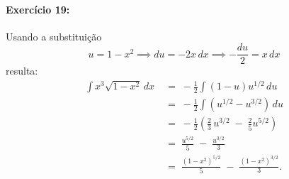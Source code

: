 \documentclass[12pt]{article}
\begin{document}

\paragraph{Exercício 19:}
Usando a substituição
\begin{equation*}
u = 1-x^{2}
\implies du = -2x\,dx
\implies -\frac{du}{2} = x\,dx
\end{equation*}
resulta:
\begin{align*}
\int x^{3}\sqrt{1-x^{2}}\,dx
&\;=\; -\frac{1}{2}\int(1-u)u^{1/2}\,du \\
&\;=\; -\frac{1}{2}\int\left(u^{1/2} - u^{3/2}\right)\,du \\
&\;=\; -\frac{1}{2}\left(\frac{2}{3}\,u^{3/2} \;-\; \frac{2}{5}u^{5/2}\right) \\
&\;=\; \frac{u^{5/2}}{5} \;-\; \frac{u^{3/2}}{3} \\
&\;=\; \frac{(1-x^{2})^{5/2}}{5} \;-\; \frac{(1-x^{2})^{3/2}}{3}.
\end{align*}

\end{document}
